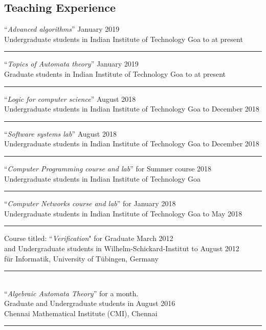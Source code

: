 \documentclass[margin]{res}
\begin{document}
\begin{resume}
\section{Teaching Experience}
					``\emph{Advanced algorithms}'' \hfill January 2019 \\
					Undergraduate students in Indian Institute of Technology Goa \hfill to at present \\
					\noindent\rule{13cm}{0.4pt}
					``\emph{Topics of Automata theory}'' \hfill January 2019 \\
					Graduate students in Indian Institute of Technology Goa \hfill to at present \\
					\noindent\rule{13cm}{0.4pt}
					``\emph{Logic for computer science}'' \hfill August 2018 \\
					Undergraduate students in Indian Institute of Technology Goa \hfill to December 2018 \\
					\noindent\rule{13cm}{0.4pt}
					``\emph{Software systems lab}''   \hfill August 2018 \\
					Undergraduate students in Indian Institute of Technology Goa \hfill to December 2018 \\
					\noindent\rule{13cm}{0.4pt}					
					``\emph{Computer Programming course and lab}'' for  \hfill Summer course 2018 \\
					Undergraduate students in Indian Institute of Technology Goa \hfill  \\
					\noindent\rule{13cm}{0.4pt}					
					``\emph{Computer Networks course and lab}'' for  \hfill January 2018 \\
					Undergraduate students in Indian Institute of Technology Goa \hfill to May 2018 \\
					\noindent\rule{13cm}{0.4pt}
					Course titled: ``\emph{Verification}" for Graduate  \hfill March 2012  \\
					and Undergraduate students in Wilhelm-Schickard-Institut \hfill to August 2012\\ 
					f\"ur Informatik, University of T\"ubingen, Germany \\
					\noindent\rule{13cm}{0.4pt} \\
					``\emph{Algebraic Automata Theory}'' for a month. \hfill  \\
					 Graduate and Undergraduate students in \hfill  August 2016 \\
					 Chennai Mathematical Institute (CMI), Chennai \\
					\noindent\rule{13cm}{0.4pt}


\end{resume}
\end{document}
